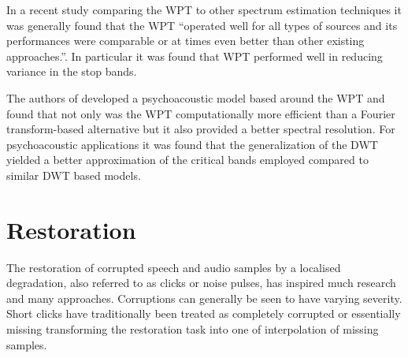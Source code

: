 In a recent study comparing the WPT to other spectrum estimation techniques it was generally found that the WPT ``operated well for all types of sources and its performances were comparable or at times even better than other existing approaches.''\cite{Ariananda2013}. In particular it was found that WPT performed well in reducing variance in the stop bands.

The authors of \cite{He2008} developed a psychoacoustic model based around the WPT and found that not only was the WPT computationally more efficient than a Fourier transform-based alternative but it also provided a better spectral resolution. For psychoacoustic applications it was found that the generalization of the DWT yielded a better approximation of the critical bands employed\cite{Carnero1999}\cite{He2008} compared to similar DWT based models\cite{Sinha1993}\cite{Zurera2001}.

\section{Restoration}\label{sec:LitRev_Restoration}
The restoration of corrupted speech and audio samples by a localised degradation, also referred to as clicks or noise pulses, has inspired much research and many approaches. Corruptions can generally be seen to have varying severity. Short clicks have traditionally been treated as completely corrupted or essentially missing transforming the restoration task into one of interpolation of missing samples\cite{Godsill1998book}\cite{Tukey1977}\cite{Tukey1974}.




%
%
%
%
%

